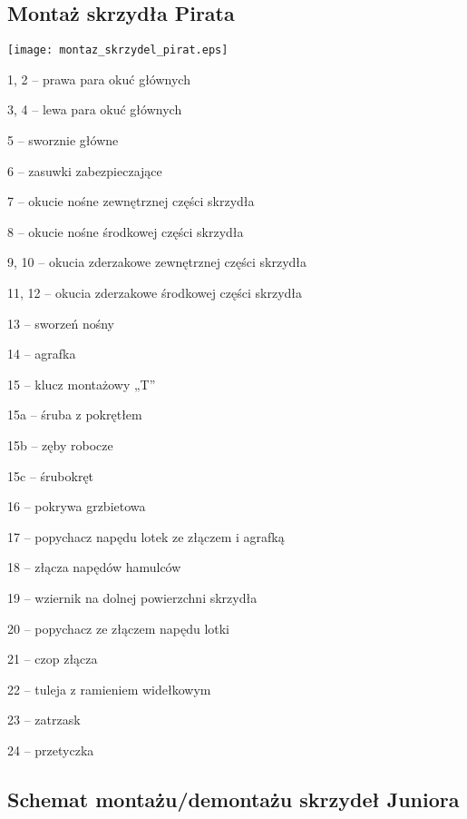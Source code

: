 \documentclass{article}
\newenvironment{packed_enum}{
\begin{enumerate}
  \setlength{\itemsep}{1pt}
  \setlength{\parskip}{0pt}
  \setlength{\parsep}{0pt}
}{\end{enumerate}}
\begin{document}
\newpage
\subsection{Montaż skrzydła Pirata}

\begin{center}
\texttt{[image: montaz\_skrzydel\_pirat.eps]}
\end{center}

\begin{packed_enum}
\item[1, 2] -- prawa para okuć głównych
\item[3, 4] -- lewa para okuć głównych
\item[5] -- sworznie główne
\item[6] -- zasuwki zabezpieczające
\item[7] -- okucie nośne zewnętrznej części skrzydła
\item[8] -- okucie nośne środkowej części skrzydła
\item[9, 10] -- okucia zderzakowe zewnętrznej części skrzydła
\item[11, 12] -- okucia zderzakowe środkowej części skrzydła
\item[13] -- sworzeń nośny
\item[14] -- agrafka
\item[15] -- klucz montażowy „T”
\item[15a] -- śruba z pokrętłem
\item[15b] -- zęby robocze
\item[15c] -- śrubokręt
\item[16] -- pokrywa grzbietowa
\item[17] -- popychacz napędu lotek ze złączem i agrafką
\item[18] -- złącza napędów hamulców
\item[19] -- wziernik na dolnej powierzchni skrzydła
\item[20] -- popychacz ze złączem napędu lotki
\item[21] -- czop złącza
\item[22] -- tuleja z ramieniem widełkowym
\item[23] -- zatrzask
\item[24] -- przetyczka
\end{packed_enum}

\newpage
\subsection{Schemat montażu/demontażu skrzydeł Juniora}
\end{document}
